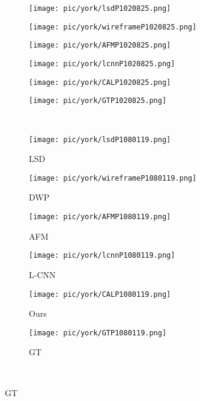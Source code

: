 \documentclass[runningheads]{llncs}
\begin{document}
\begin{figure}[H]
\begin{center}
     \begin{subfigure}[b]{0.15\textwidth}
         \centering
         \texttt{[image: pic/york/lsdP1020825.png]}
     \end{subfigure}
    \begin{subfigure}[b]{0.15\textwidth}
         \centering
         \texttt{[image: pic/york/wireframeP1020825.png]}
     \end{subfigure}
     \begin{subfigure}[b]{0.15\textwidth}
         \centering
         \texttt{[image: pic/york/AFMP1020825.png]}
     \end{subfigure}
     \begin{subfigure}[b]{0.15\textwidth}
         \centering
         \texttt{[image: pic/york/lcnnP1020825.png]}
     \end{subfigure}
     \begin{subfigure}[b]{0.15\textwidth}
         \centering
         \texttt{[image: pic/york/CALP1020825.png]}
     \end{subfigure}
     \begin{subfigure}[b]{0.15\textwidth}
         \centering
         \texttt{[image: pic/york/GTP1020825.png]}
     \end{subfigure}
     ~~
     
      \begin{subfigure}[b]{0.15\textwidth}
         \centering
         \texttt{[image: pic/york/lsdP1080119.png]}
         \caption{LSD}
     \end{subfigure}
    \begin{subfigure}[b]{0.15\textwidth}
         \centering
         \texttt{[image: pic/york/wireframeP1080119.png]}
         \caption{DWP}
     \end{subfigure}
     \begin{subfigure}[b]{0.15\textwidth}
         \centering
         \texttt{[image: pic/york/AFMP1080119.png]}
         \caption{AFM}
     \end{subfigure}
     \begin{subfigure}[b]{0.15\textwidth}
         \centering
         \texttt{[image: pic/york/lcnnP1080119.png]}
         \caption{L-CNN}
     \end{subfigure}
     \begin{subfigure}[b]{0.15\textwidth}
         \centering
         \texttt{[image: pic/york/CALP1080119.png]}
         \caption{Ours}
     \end{subfigure}
     \begin{subfigure}[b]{0.15\textwidth}
         \centering
         \texttt{[image: pic/york/GTP1080119.png]}
         \caption{GT}
     \end{subfigure}
     ~~
     

\end{center}
\end{figure}
\end{document}
